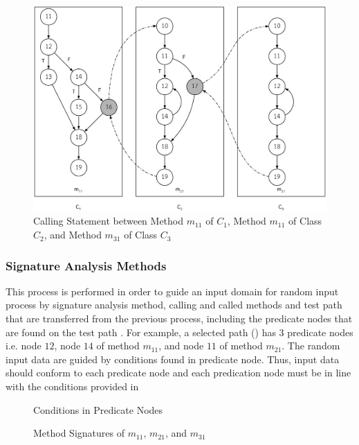 \begin{figure}[ht!]
\centering
\includegraphics[width=\linewidth]{figures/Calling-statements-of-Classes}
\caption{Calling Statement between Method $m_{11}$ of $C_1$, Method $m_{11}$ of Class $C_2$, and Method $m_{31}$ of Class $C_3$}
\label{fig:callingStatement}
\end{figure}

\subsubsection{Signature Analysis Methods}
This process is performed in order to guide an input domain for random input process 
by signature analysis method, calling and called methods and test path that are transferred 
from the previous process, including the predicate nodes that are found on the test path \cite{Ma2016}. 
For example, a selected path () has 3 predicate nodes i.e. 
node $12$, node $14$ of method $m_{11}$, and node $11$ of method $m_{21}$. The random input data 
are guided by conditions found in predicate node.  Thus, input data should conform 
to each predicate node and each predication node must be in line with the conditions provided in 

\begin{figure}[ht!]
    \centering
     \par
     \par
    \caption{Conditions in Predicate Nodes}
    \label{fig:conditionsPredicate}
\end{figure}
\begin{figure}[ht!]
    \centering
     \par
     \par
    \caption{Method Signatures of $m_{11}$, $m_{21}$, and $m_{31}$}
    \label{fig:methodSignature}
\end{figure}

